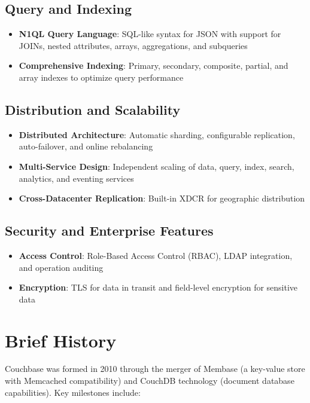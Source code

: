 \subsection{Query and Indexing}
\begin{itemize}
  \item \textbf{N1QL Query Language}: SQL-like syntax for JSON with support for JOINs, nested attributes, arrays, aggregations, and subqueries
  \item \textbf{Comprehensive Indexing}: Primary, secondary, composite, partial, and array indexes to optimize query performance
\end{itemize}

\subsection{Distribution and Scalability}
\begin{itemize}
  \item \textbf{Distributed Architecture}: Automatic sharding, configurable replication, auto-failover, and online rebalancing
  \item \textbf{Multi-Service Design}: Independent scaling of data, query, index, search, analytics, and eventing services
  \item \textbf{Cross-Datacenter Replication}: Built-in XDCR for geographic distribution
\end{itemize}

\subsection{Security and Enterprise Features}
\begin{itemize}
  \item \textbf{Access Control}: Role-Based Access Control (RBAC), LDAP integration, and operation auditing
  \item \textbf{Encryption}: TLS for data in transit and field-level encryption for sensitive data
\end{itemize}


\section{Brief History}

Couchbase was formed in 2010 through the merger of Membase (a key-value store with Memcached compatibility) and CouchDB technology (document database capabilities). Key milestones include:


